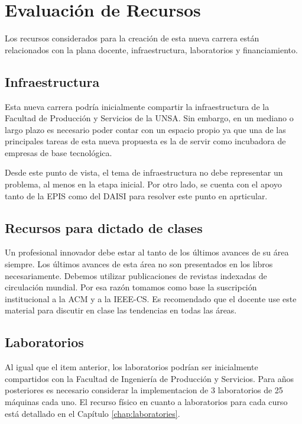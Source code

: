 \chapter{Evaluación de Recursos}\label{chap:cs-resources}

Los recursos considerados para la creación de esta nueva carrera están relacionados con la plana docente, infraestructura, laboratorios y financiamiento.


\section{Infraestructura}\label{sec:cs-infraestructura}
Esta nueva carrera podría inicialmente compartir la infraestructura de la Facultad de Producción y Servicios de la UNSA. Sin embargo, en un mediano o largo plazo es necesario poder contar con un espacio propio ya que una de las principales tareas de esta nueva propuesta es la de servir como incubadora de empresas de base tecnológica. 

Desde este punto de vista, el tema de infraestructura no debe representar un problema, al menos en la etapa inicial.
Por otro lado, se cuenta con el apoyo tanto de la EPIS como del DAISI para resolver este punto en aprticular.

\section{Recursos para dictado de clases}
Un profesional innovador debe estar al tanto de los últimos avances de su área siempre. Los últimos avances de esta área no son presentados en los libros necesariamente. Debemos utilizar publicaciones de revistas indexadas de circulación mundial. Por esa razón tomamos como base la suscripción institucional a la ACM y a la IEEE-CS. Es recomendado que el docente use este material para discutir en clase las tendencias en todas las áreas.

\section{Laboratorios}\label{sec:cs-labs}
Al igual que el item anterior, los laboratorios podrían ser inicialmente compartidos con la Facultad de Ingeniería de Producción y Servicios. Para años posteriores es necesario considerar la implementacion de 3 laboratorios de 25 máquinas cada uno. El recurso físico en cuanto a laboratorios para cada curso está detallado en el Capítulo \ref{chap:laboratories}.

